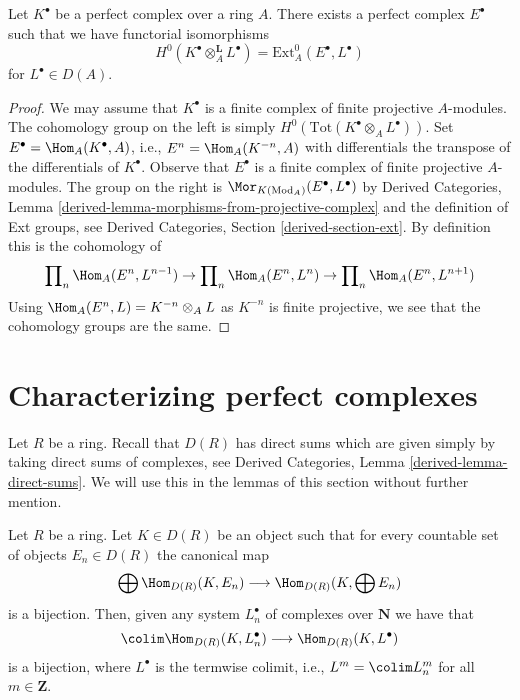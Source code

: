 \begin{lemma}
\label{lemma-dual-perfect-complex}
Let $K^\bullet$ be a perfect complex over a ring $A$. There exists a
perfect complex $E^\bullet$ such that we have functorial isomorphisms
$$
H^0(K^\bullet \otimes_A^\mathbf{L} L^\bullet) =
\text{Ext}_A^0(E^\bullet, L^\bullet)
$$
for $L^\bullet \in D(A)$.
\end{lemma}

\begin{proof}
We may assume that $K^\bullet$ is a finite complex of finite projective
$A$-modules. The cohomology group on the left is simply
$H^0(\text{Tot}(K^\bullet \otimes_A L^\bullet))$. Set
$E^\bullet = \Hom_A(K^\bullet, A)$, i.e., $E^n = \Hom_A(K^{-n}, A)$
with differentials the transpose of the differentials of $K^\bullet$.
Observe that $E^\bullet$ is a finite complex of finite projective $A$-modules.
The group on the right
is $\Mor_{K(\text{Mod}_A)}(E^\bullet, L^\bullet)$ by
Derived Categories, Lemma \ref{derived-lemma-morphisms-from-projective-complex}
and the definition of Ext groups, see
Derived Categories, Section \ref{derived-section-ext}.
By definition this is the cohomology of
$$
\prod\nolimits_n \Hom_A(E^n, L^{n - 1})
\to
\prod\nolimits_n \Hom_A(E^n, L^n)
\to
\prod\nolimits_n \Hom_A(E^n, L^{n + 1})
$$
Using $\Hom_A(E^n, L) = K^{-n} \otimes_A L$ as $K^{-n}$ is finite
projective, we see that the cohomology groups are the same.
\end{proof}





\section{Characterizing perfect complexes}
\label{section-perfect-compact}

\noindent
Let $R$ be a ring. Recall that $D(R)$ has direct sums which are given
simply by taking direct sums of complexes, see
Derived Categories, Lemma \ref{derived-lemma-direct-sums}.
We will use this in the lemmas of this section without further mention. 

\begin{lemma}
\label{lemma-commutes-with-countable-sums}
Let $R$ be a ring. Let $K \in D(R)$ be an object such that for every
countable set of objects $E_n \in D(R)$ the canonical map
$$
\bigoplus \Hom_{D(R)}(K, E_n) \longrightarrow \Hom_{D(R)}(K, \bigoplus E_n)
$$
is a bijection. Then, given any system $L_n^\bullet$ of complexes over
$\mathbf{N}$ we have that
$$
\colim \Hom_{D(R)}(K, L^\bullet_n) \longrightarrow \Hom_{D(R)}(K, L^\bullet)
$$
is a bijection, where $L^\bullet$ is the termwise colimit, i.e.,
$L^m = \colim L_n^m$ for all $m \in \mathbf{Z}$.
\end{lemma}


